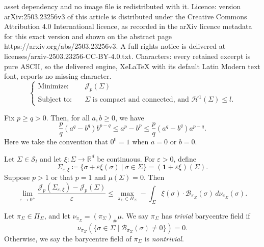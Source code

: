 \documentclass[10pt,a4paper]{amsart}
\renewcommand{\epsilon}{\varepsilon}
\begin{document}
asset dependency and no image file is redistributed with it. Licence: version arXiv:2503.23256v3 of this article is distributed under the Creative Commons Attribution 4.0 International licence, as recorded in the arXiv licence metadata for this exact version and shown on the abstract page https://arxiv.org/abs/2503.23256v3. A full rights notice is delivered at licenses/arxiv-2503.23256-CC-BY-4.0.txt. Characters: every retained excerpt is pure ASCII, so the delivered engine, XeLaTeX with its default Latin Modern text font, reports no missing character.
\begin{equation}
  \label{eq:adp}
  \begin{cases}
    \text{Minimize:} \quad
    & \mathscr J_p(\Sigma) \\
    \text{Subject to:} \quad
    & \Sigma \text{ is compact and connected, and } \mathcal H^1(\Sigma)
    \leq l.
  \end{cases}
  \tag{ADP}
\end{equation}

\begin{lemma}\label{lemma:basicinequality}
  Fix $p \geq q > 0$. Then, for all $a, b \geq 0$, we have
  \[
    \frac{p}{q} (a^q - b^q)b^{p-q}\leq a^p - b^p \leq \frac{p}{q}(a^q
    - b^q) a^{p-q}.
  \]
  Here we take the convention that $0^0=1$ when $a=0$ or $b=0$.
\end{lemma}

\begin{proposition}
  \label{strongbarycentreapproximation}
  Let $\Sigma \in \mathcal{S}_l$ and let $\xi : \Sigma \to
  \mathbb{R}^d$ be continuous. For $\epsilon > 0$, define
  \begin{equation}\label{eq:perturbedsigma}
    \Sigma_{\epsilon, \xi} \coloneqq \{\sigma + \epsilon \xi(\sigma) \
    | \ \sigma \in \Sigma\} = (\mathbf{1} + \epsilon \xi)(\Sigma).
  \end{equation}
  Suppose $p > 1$ or that $p = 1$ and $\mu(\Sigma) = 0$.
  Then
  \begin{equation} \lim_{\varepsilon \to 0^{+}}
    \frac{\mathscr{J}_p(\Sigma_{\varepsilon, \xi}) -
      \mathscr{J}_p(\Sigma)}{\varepsilon} \leq \max_{\pi_{\Sigma}\in
      \Pi_{\Sigma}}- \int_\Sigma \xi(\sigma) \cdot
    \mathcal{B}_{\pi_\Sigma}(\sigma) \,
    d\nu_{\pi_{\Sigma}}(\sigma). \label{eq:fbary-grad-J-min}
  \end{equation}
\end{proposition}

\begin{definition}\label{def:trivialbarycentrefield}
  Let $\pi_{\Sigma} \in \Pi_{\Sigma}$, and let $\nu_{\pi_{\Sigma}}=
  (\pi_{\Sigma})_{\#}\mu$. We say $\pi_{\Sigma}$ has \textit{trivial}
  barycentre field if
  \[
    \nu_{\pi_{\Sigma}}(\{\sigma \in \Sigma \mid
    \mathcal{B}_{\pi_{\Sigma}}(\sigma) \ne 0\}) = 0.
  \]
  Otherwise, we say the barycentre field of $\pi_{\Sigma}$ is
  \textit{nontrivial}.
\end{definition}
\end{document}
